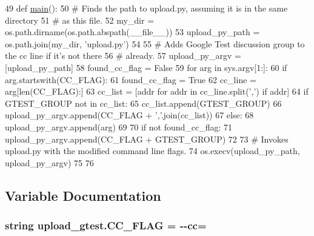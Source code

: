 \begin{DoxyCode}
49 \textcolor{keyword}{def }\hyperlink{namespacerelease__docs_ac4eb92814ebe701e3936d1bfdd2ecf73}{main}():
50   \textcolor{comment}{# Finds the path to upload.py, assuming it is in the same directory}
51   \textcolor{comment}{# as this file.}
52   my\_dir = os.path.dirname(os.path.abspath(\_\_file\_\_))
53   upload\_py\_path = os.path.join(my\_dir, \textcolor{stringliteral}{'upload.py'})
54 
55   \textcolor{comment}{# Adds Google Test discussion group to the cc line if it's not there}
56   \textcolor{comment}{# already.}
57   upload\_py\_argv = [upload\_py\_path]
58   found\_cc\_flag = \textcolor{keyword}{False}
59   \textcolor{keywordflow}{for} arg \textcolor{keywordflow}{in} sys.argv[1:]:
60     \textcolor{keywordflow}{if} arg.startswith(CC\_FLAG):
61       found\_cc\_flag = \textcolor{keyword}{True}
62       cc\_line = arg[len(CC\_FLAG):]
63       cc\_list = [addr \textcolor{keywordflow}{for} addr \textcolor{keywordflow}{in} cc\_line.split(\textcolor{stringliteral}{','}) \textcolor{keywordflow}{if} addr]
64       \textcolor{keywordflow}{if} GTEST\_GROUP \textcolor{keywordflow}{not} \textcolor{keywordflow}{in} cc\_list:
65         cc\_list.append(GTEST\_GROUP)
66       upload\_py\_argv.append(CC\_FLAG + \textcolor{stringliteral}{','}.join(cc\_list))
67     \textcolor{keywordflow}{else}:
68       upload\_py\_argv.append(arg)
69 
70   \textcolor{keywordflow}{if} \textcolor{keywordflow}{not} found\_cc\_flag:
71     upload\_py\_argv.append(CC\_FLAG + GTEST\_GROUP)
72 
73   \textcolor{comment}{# Invokes upload.py with the modified command line flags.}
74   os.execv(upload\_py\_path, upload\_py\_argv)
75 
76 
\end{DoxyCode}


\subsection{Variable Documentation}
\subsubsection[{\texorpdfstring{C\+C\+\_\+\+F\+L\+AG}{CC_FLAG}}]{\setlength{\rightskip}{0pt plus 5cm}string upload\+\_\+gtest.\+C\+C\+\_\+\+F\+L\+AG = \textquotesingle{}-\/-\/{\bf cc}=\textquotesingle{}}\hypertarget{namespaceupload__gtest_a83f0946f9ee3731253fc622acd581fc2}{}\label{namespaceupload__gtest_a83f0946f9ee3731253fc622acd581fc2}
